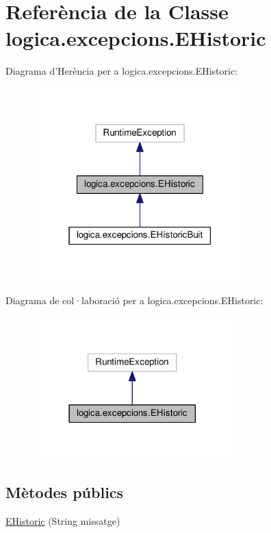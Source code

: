 \hypertarget{classlogica_1_1excepcions_1_1_e_historic}{\section{Referència de la Classe logica.\+excepcions.\+E\+Historic}
\label{classlogica_1_1excepcions_1_1_e_historic}
}


Diagrama d'Herència per a logica.\+excepcions.\+E\+Historic\+:\nopagebreak
\begin{figure}[H]
\begin{center}
\leavevmode
\includegraphics[width=235pt]{classlogica_1_1excepcions_1_1_e_historic__inherit__graph}
\end{center}
\end{figure}


Diagrama de col·laboració per a logica.\+excepcions.\+E\+Historic\+:\nopagebreak
\begin{figure}[H]
\begin{center}
\leavevmode
\includegraphics[width=218pt]{classlogica_1_1excepcions_1_1_e_historic__coll__graph}
\end{center}
\end{figure}
\subsection*{Mètodes públics}
\begin{DoxyCompactItemize}
\item 
\hyperlink{classlogica_1_1excepcions_1_1_e_historic_acab5c3f0a9627e9d9d228e34922dcb2b}{E\+Historic} (String missatge)
\end{DoxyCompactItemize}


